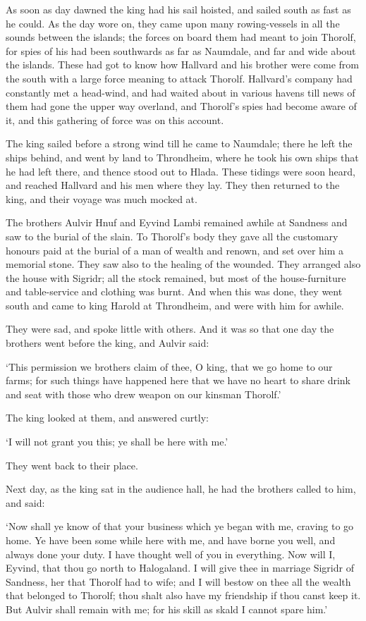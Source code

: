As soon as day dawned the king had his sail hoisted, and sailed south as fast as he could. As the day wore on, they came upon many rowing-vessels in all the sounds between the islands; the forces on board them had meant to join Thorolf, for spies of his had been southwards as far as Naumdale, and far and wide about the islands. These had got to know how Hallvard and his brother were come from the south with a large force meaning to attack Thorolf. Hallvard's company had constantly met a head-wind, and had waited about in various havens till news of them had gone the upper way overland, and Thorolf's spies had become aware of it, and this gathering of force was on this account.

The king sailed before a strong wind till he came to Naumdale; there he left the ships behind, and went by land to Throndheim, where he took his own ships that he had left there, and thence stood out to Hlada. These tidings were soon heard, and reached Hallvard and his men where they lay. They then returned to the king, and their voyage was much mocked at.

The brothers Aulvir Hnuf and Eyvind Lambi remained awhile at Sandness and saw to the burial of the slain. To Thorolf's body they gave all the customary honours paid at the burial of a man of wealth and renown, and set over him a memorial stone. They saw also to the healing of the wounded. They arranged also the house with Sigridr; all the stock remained, but most of the house-furniture and table-service and clothing was burnt. And when this was done, they went south and came to king Harold at Throndheim, and were with him for awhile.

They were sad, and spoke little with others. And it was so that one day the brothers went before the king, and Aulvir said:

`This permission we brothers claim of thee, O king, that we go home to our farms; for such things have happened here that we have no heart to share drink and seat with those who drew weapon on our kinsman Thorolf.'

The king looked at them, and answered curtly:

`I will not grant you this; ye shall be here with me.'

They went back to their place.

Next day, as the king sat in the audience hall, he had the brothers called to him, and said:

`Now shall ye know of that your business which ye began with me, craving to go home. Ye have been some while here with me, and have borne you well, and always done your duty. I have thought well of you in everything. Now will I, Eyvind, that thou go north to Halogaland. I will give thee in marriage Sigridr of Sandness, her that Thorolf had to wife; and I will bestow on thee all the wealth that belonged to Thorolf; thou shalt also have my friendship if thou canst keep it. But Aulvir shall remain with me; for his skill as skald I cannot spare him.'

